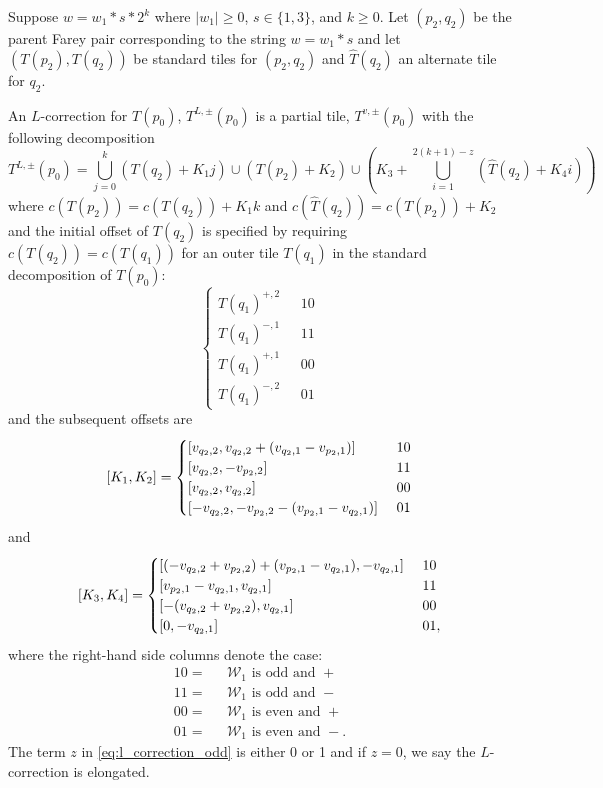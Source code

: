\documentclass[12pt]{amsart}
\begin{document}
\begin{definition} \label{def:odd_l_correction}


	Suppose $w = w_1 * s * 2^k$ where $|w_1| \geq 0$, $s \in \{1,3\}$, and $k \geq 0$.
	Let $(p_2, q_2)$ be the parent Farey pair corresponding to the string $w = w_1*s$ and let $(T(p_2), T(q_2))$ be standard tiles for $(p_2,q_2)$ and $\hat{T}(q_2)$ an alternate tile for $q_2$. 
	
	
	An $L$-correction for $T(p_0)$, $T^{L,\pm}(p_0)$ is a partial tile, $T^{v, \pm}(p_0)$ with the following decomposition
	\begin{equation}\label{eq:l_correction_odd}
	T^{L,\pm}(p_0) = \bigcup_{j=0}^{k} (T(q_2) + K_1 j) \cup  (T(p_2) + K_2) \cup \left(K_3 + \bigcup_{i=1}^{2(k+1)-z} (\hat{T}(q_2) +  K_4 i)\right)
	\end{equation}
	where $c(T(p_2)) = c(T(q_2)) + K_1 k$ and $c(\hat{T}(q_2)) = c(T(p_2)) + K_2$ and the initial offset of $T(q_2)$ is specified by requiring $c(T(q_2)) = c(T(q_1))$ for an outer tile $T(q_1)$ in the standard decomposition of $T(p_0)$:
	\[
	\begin{cases}
	T(q_1)^{+,2}  &\mbox{ $10$} \\
	T(q_1)^{-,1} &\mbox{ $11$} \\
	T(q_1)^{+,1} &\mbox{ $00$} \\
	T(q_1)^{-,2} &\mbox{ $01$} 
	\end{cases}
	\]
	and the subsequent offsets are
	\[
	[K_1,K_2] = 
	\begin{cases}
	[v_{q_2,2}, v_{q_2,2} + (v_{q_2,1} - v_{p_2,1} )]  &\mbox{ $ 1 0 $} \\
	[v_{q_2,2}, -v_{p_2,2}] &\mbox{ $1 1$} \\
	[v_{q_2,2},v_{q_2,2}] &\mbox{ $0 0$} \\
	[-v_{q_2,2},-v_{p_2,2}-(v_{p_2,1} - v_{q_2,1})] &\mbox{ $0 1$} 
	\end{cases}
	\]
	and
	\[
	[K_3,K_4] =
	\begin{cases}
	[(-v_{q_2,2}+v_{p_2,2}) + (v_{p_2,1} - v_{q_2,1}), -v_{q_2,1}]  &\mbox{ $ 1 0 $} \\
	[v_{p_2,1}-v_{q_2,1}, v_{q_2,1}] &\mbox{ $1 1$} \\
	[-(v_{q_2,2}+v_{p_2,2}), v_{q_2,1}] &\mbox{ $0 0$} \\
	[0, -v_{q_2,1}] &\mbox{ $0 1$},
	\end{cases}
	\]
	where the right-hand side columns denote the case:
	\begin{equation} \label{eq:case_labels}
	\begin{aligned}
		1 0 =&\mbox{ $\mathcal{W}_1$ is odd and $+$}  \\
		1 1 =&\mbox{ $\mathcal{W}_1$ is odd and $-$}  \\
		0 0 =&\mbox{ $\mathcal{W}_1$ is even and $+$}  \\
		0 1 =&\mbox{ $\mathcal{W}_1$ is even and $-$}.
	\end{aligned}
	\end{equation}
The term $z$ in \eqref{eq:l_correction_odd} is either 0 or 1 and if $z = 0$, we say the $L$-correction is elongated. 
\end{definition}
\end{document}

